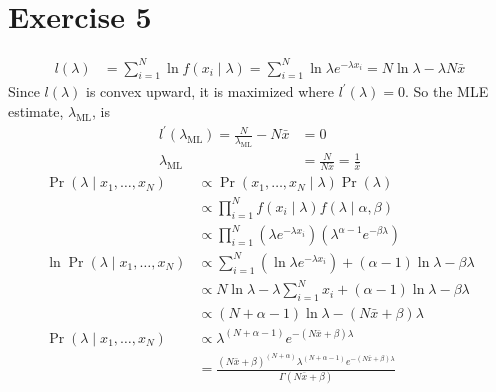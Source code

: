 \documentclass[letterpaper]{amsart}
\begin{document}
\section*{Exercise 5}
\begin{align*}
  l(\lambda)
  &= \sum_{i=1}^N\ln f(x_i \mid \lambda)
    = \sum_{i=1}^N\ln\lambda e^{-\lambda x_i}
    = N\ln\lambda - \lambda N\bar{x}
\end{align*}
Since
$l(\lambda)$
is convex upward, it is maximized where
$l^\prime(\lambda) = 0$.
So the MLE estimate,
\(\lambda_{\text{ML}}\),
is
\begin{align*}
  l^\prime
  (\lambda_{\text{ML}})
  = \frac{N}{\lambda_{\text{ML}}} - N\bar{x}
  &=0
    \\
  \lambda_{\text{ML}}
  &= \frac
  {N}
  {N\bar{x}}
  = \frac
  {1}
  {\bar{x}}
\end{align*}
\begin{align*}
  \Pr(\lambda\mid x_1,\dots, x_N)
  &\propto
    \Pr(x_1,\dots, x_N\mid\lambda)\Pr(\lambda)
    \\
  &\propto
    \prod_{i=1}^Nf(x_i\mid\lambda)f(\lambda\mid\alpha,\beta)
    \\
  &\propto
    \prod_{i=1}^N\left(\lambda e^{-\lambda x_i}\right)
    \left( \lambda^{\alpha-1} e^{-\beta\lambda} \right)
    \\
  \ln\Pr(\lambda\mid x_1,\dots, x_N)
  &\propto
   \sum_{i=1}^N \left( \ln \lambda e^{-\lambda x_i} \right)
    + (\alpha - 1)\ln\lambda-\beta\lambda
    \\
  &\propto
    N\ln\lambda - \lambda \sum_{i=1}^N x_i
    + (\alpha - 1)\ln\lambda-\beta\lambda
    \\
  &\propto
    \left(
    N+\alpha-1
    \right)
    \ln\lambda
    -(N\bar{x} + \beta)\lambda
    \\
  \Pr(\lambda\mid x_1,\dots, x_N)
  &\propto
    \lambda^{
    \left(
    N+\alpha-1
    \right)
    }
    e^{
    -(N\bar{x}+ \beta)\lambda
    }
    \\
  &=
    \frac{
    (N\bar{x}+\beta)^{(N+\alpha)}
    \lambda^{(N+\alpha-1)}
    e^{-(N\bar{x} + \beta)\lambda}
    }
    {
    \Gamma\left(
    N\bar{x}+\beta
    \right)
    }
\end{align*}
\end{document}
